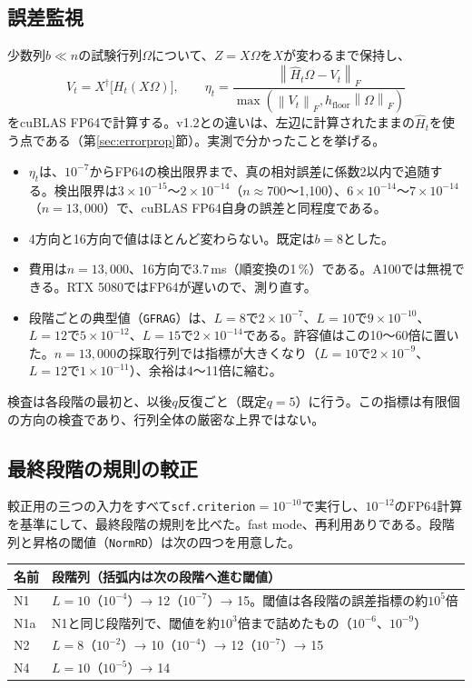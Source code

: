 \documentclass[a4paper,11pt]{ltjsarticle}
\newcommand{\code}[1]{\texttt{#1}}
\newcommand{\norm}[1]{\left\lVert#1\right\rVert}
\newcommand{\E}[1]{\times10^{#1}}
\begin{document}
\subsection{誤差監視}\label{sec:monitor}
少数列$b\ll n$の試験行列$\Omega$について、$Z=X\Omega$を$X$が変わるまで保持し、
\begin{equation}
 V_t=X^\dagger\bigl[H_t(X\Omega)\bigr],\qquad
 \eta_t=\frac{\norm{\widehat H_t\Omega-V_t}_F}
 {\max(\norm{V_t}_F,h_{\mathrm{floor}}\norm{\Omega}_F)}
 \label{eq:eta}
\end{equation}
をcuBLAS FP64で計算する。v1.2との違いは、左辺に計算されたままの$\widehat H_t$を使う点である（第\ref{sec:errorprop}節）。実測で分かったことを挙げる。
\begin{itemize}
\item $\eta_t$は、$10^{-7}$からFP64の検出限界まで、真の相対誤差に係数2以内で追随する。検出限界は$3\E{-15}$〜$2\E{-14}$（$n\approx700$〜1,100）、$6\E{-14}$〜$7\E{-14}$（$n=13{,}000$）で、cuBLAS FP64自身の誤差と同程度である。
\item 4方向と16方向で値はほとんど変わらない。既定は$b=8$とした。
\item 費用は$n=13{,}000$、16方向で3.7\,ms（順変換の1\,\%）である。A100では無視できる。RTX 5080ではFP64が遅いので、測り直す。
\item 段階ごとの典型値（\code{GFRAG}）は、$L=8$で$2\E{-7}$、$L=10$で$9\E{-10}$、$L=12$で$5\E{-12}$、$L=15$で$2\E{-14}$である。許容値はこの10〜60倍に置いた。$n=13{,}000$の採取行列では指標が大きくなり（$L=10$で$2\E{-9}$、$L=12$で$1\E{-11}$）、余裕は4〜11倍に縮む。
\end{itemize}
検査は各段階の最初と、以後$q$反復ごと（既定$q=5$）に行う。この指標は有限個の方向の検査であり、行列全体の厳密な上界ではない。

\subsection{最終段階の規則の較正}\label{sec:calib}
較正用の三つの入力をすべて\code{scf.criterion}$=10^{-10}$で実行し、$10^{-12}$のFP64計算を基準にして、最終段階の規則を比べた。fast mode、再利用ありである。段階列と昇格の閾値（\code{NormRD}）は次の四つを用意した。

\noindent\begin{tabularx}{\linewidth}{@{}p{12mm}Y@{}}
\toprule
名前 & 段階列（括弧内は次の段階へ進む閾値）\\
\midrule
N1 & $L=10$（$10^{-4}$）→ 12（$10^{-7}$）→ 15。閾値は各段階の誤差指標の約$10^{5}$倍\\
N1a & N1と同じ段階列で、閾値を約$10^{3}$倍まで詰めたもの（$10^{-6}$、$10^{-9}$）\\
N2 & $L=8$（$10^{-2}$）→ 10（$10^{-4}$）→ 12（$10^{-7}$）→ 15\\
N4 & $L=10$（$10^{-5}$）→ 14\\
\bottomrule
\end{tabularx}
\end{document}
